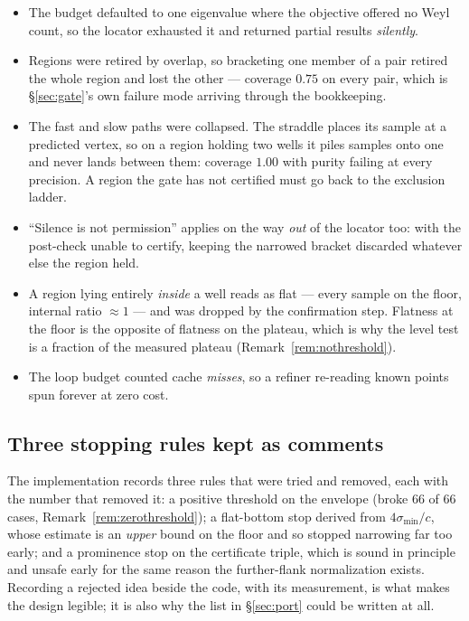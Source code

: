 \documentclass[11pt]{article}
\theoremstyle{definition}
\theoremstyle{remark}
\newcommand{\sig}{\sigma}
\begin{document}
\begin{itemize}
\item The budget defaulted to one eigenvalue where the objective offered no Weyl count, so the
locator exhausted it and returned partial results \emph{silently}.
\item Regions were retired by overlap, so bracketing one member of a pair retired the whole
region and lost the other --- coverage $0.75$ on every pair, which is
\S\ref{sec:gate}'s own failure mode arriving through the bookkeeping.
\item The fast and slow paths were collapsed. The straddle places its sample at a predicted
vertex, so on a region holding two wells it piles samples onto one and never lands between
them: coverage $1.00$ with purity failing at every precision. A region the gate has not
certified must go back to the exclusion ladder.
\item ``Silence is not permission'' applies on the way \emph{out} of the locator too: with the
post-check unable to certify, keeping the narrowed bracket discarded whatever else the region
held.
\item A region lying entirely \emph{inside} a well reads as flat --- every sample on the floor,
internal ratio $\approx1$ --- and was dropped by the confirmation step. Flatness at the floor is
the opposite of flatness on the plateau, which is why the level test is a fraction of the
measured plateau (Remark~\ref{rem:nothreshold}).
\item The loop budget counted cache \emph{misses}, so a refiner re-reading known points spun
forever at zero cost.
\end{itemize}

\subsection{Three stopping rules kept as comments}

The implementation records three rules that were tried and removed, each with the number that
removed it: a positive threshold on the envelope (broke 66 of 66 cases,
Remark~\ref{rem:zerothreshold}); a flat-bottom stop derived from $4\sig_{\min}/c$, whose
estimate is an \emph{upper} bound on the floor and so stopped narrowing far too early; and a
prominence stop on the certificate triple, which is sound in principle and unsafe early for the
same reason the further-flank normalization exists. Recording a rejected idea beside the code,
with its measurement, is what makes the design legible; it is also why the list in
\S\ref{sec:port} could be written at all.
\end{document}

